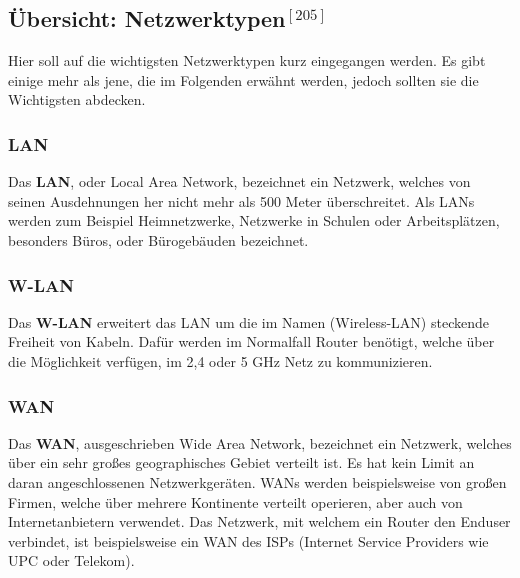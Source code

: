 \documentclass[12pt,a4paper]{report}
\begin{document}
\begin{onehalfspace}
\subsection{Übersicht: Netzwerktypen$^{[205]}$}
Hier soll auf die wichtigsten Netzwerktypen kurz eingegangen werden. Es gibt einige mehr als jene, die im Folgenden erwähnt werden, jedoch sollten sie die Wichtigsten abdecken.
\subsubsection{LAN}
Das \textbf{LAN}, oder Local Area Network, bezeichnet ein Netzwerk, welches von seinen Ausdehnungen her nicht mehr als 500 Meter überschreitet. Als LANs werden zum Beispiel Heimnetzwerke, Netzwerke in Schulen oder Arbeitsplätzen, besonders Büros, oder Bürogebäuden bezeichnet.
\subsubsection{W-LAN}
Das \textbf{W-LAN} erweitert das LAN um die im Namen (Wireless-LAN) steckende Freiheit von Kabeln. Dafür werden im Normalfall Router benötigt, welche über die Möglichkeit verfügen, im 2,4 oder 5 GHz Netz zu kommunizieren.
\subsubsection{WAN}
Das \textbf{WAN}, ausgeschrieben Wide Area Network, bezeichnet ein Netzwerk, welches über ein sehr großes geographisches Gebiet verteilt ist. Es hat kein Limit an daran angeschlossenen Netzwerkgeräten. WANs werden beispielsweise von großen Firmen, welche über mehrere Kontinente verteilt operieren, aber auch von Internetanbietern verwendet. Das Netzwerk, mit welchem ein Router den Enduser verbindet, ist beispielsweise ein WAN des ISPs (Internet Service Providers wie UPC oder Telekom). 

\end{onehalfspace}
\end{document}
